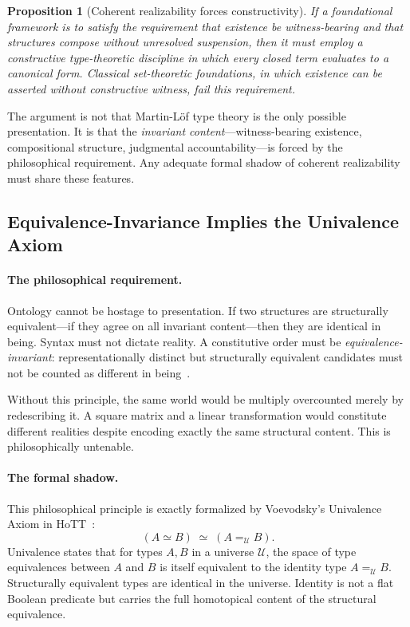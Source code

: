 \documentclass[11pt,a4paper]{article}
\theoremstyle{plain}
\newtheorem{proposition}[theorem]{Proposition}
\theoremstyle{definition}
\theoremstyle{remark}
\newcommand{\U}{\mathcal{U}}
\begin{document}
\begin{proposition}[Coherent realizability forces constructivity]
\label{prop:constructive}
If a foundational framework is to satisfy the requirement that existence be witness-bearing and that structures compose without unresolved suspension, then it must employ a constructive type-theoretic discipline in which every closed term evaluates to a canonical form.  Classical set-theoretic foundations, in which existence can be asserted without constructive witness, fail this requirement.
\end{proposition}

The argument is not that Martin-L\"{o}f type theory is the only possible presentation.  It is that the \emph{invariant content}---witness-bearing existence, compositional structure, judgmental accountability---is forced by the philosophical requirement.  Any adequate formal shadow of coherent realizability must share these features.


\subsection{Equivalence-Invariance Implies the Univalence Axiom}
\label{sec:univalence}

\paragraph{The philosophical requirement.}
Ontology cannot be hostage to presentation.  If two structures are structurally equivalent---if they agree on all invariant content---then they are identical in being.  Syntax must not dictate reality.  A constitutive order must be \emph{equivalence-invariant}: representationally distinct but structurally equivalent candidates must not be counted as different in being~\cite{worrall1989,ladyman1998,french2014,shapiro1997}.

Without this principle, the same world would be multiply overcounted merely by redescribing it.  A square matrix and a linear transformation would constitute different realities despite encoding exactly the same structural content.  This is philosophically untenable.

\paragraph{The formal shadow.}
This philosophical principle is exactly formalized by Voevodsky's Univalence Axiom in HoTT~\cite{hottbook}:
\begin{equation}
\label{eq:univalence}
(A \simeq B) \;\simeq\; (A =_{\U} B).
\end{equation}
Univalence states that for types $A, B$ in a universe $\U$, the space of type equivalences between $A$ and $B$ is itself equivalent to the identity type $A =_{\U} B$.  Structurally equivalent types are identical in the universe.  Identity is not a flat Boolean predicate but carries the full homotopical content of the structural equivalence.
\end{document}
